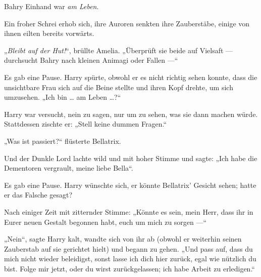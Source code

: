 Bahry Einhand war \emph{am Leben}.

Ein froher Schrei erhob sich, ihre Auroren senkten ihre Zauberstäbe, einige von ihnen eilten bereits vorwärts.

„\emph{Bleibt auf der Hut!}“, brüllte Amelia. „Überprüft sie beide auf Vielsaft — durchsucht Bahry nach kleinen Animagi oder Fallen —“

\later

 

Es gab eine Pause. Harry spürte, obwohl er es nicht richtig sehen konnte, dass die unsichtbare Frau sich auf die Beine stellte und ihren Kopf drehte, um sich umzusehen.
„Ich bin … am Leben …?“

Harry war versucht, nein zu sagen, nur um zu sehen, was sie dann machen würde. Stattdessen zischte er:
„Stell keine dummen Fragen.“

„Was ist passiert?“ flüsterte Bellatrix.

Und der Dunkle Lord lachte wild und mit hoher Stimme und sagte:
„Ich habe die Dementoren vergrault, meine liebe Bella“.

Es gab eine Pause. Harry wünschte sich, er könnte Bellatrix’ Gesicht sehen; hatte er das Falsche gesagt?

Nach einiger Zeit mit zitternder Stimme:
„Könnte es sein, mein Herr, dass ihr in Eurer neuen Gestalt begonnen habt, euch um mich zu sorgen —“

„Nein“, sagte Harry kalt, wandte sich von ihr ab (obwohl er weiterhin seinen Zauberstab auf sie gerichtet hielt) und begann zu gehen.
„Und pass auf, dass du mich nicht wieder beleidigst, sonst lasse ich dich hier zurück, egal wie nützlich du bist. Folge mir jetzt, oder du wirst zurückgelassen; ich habe Arbeit zu erledigen.“

